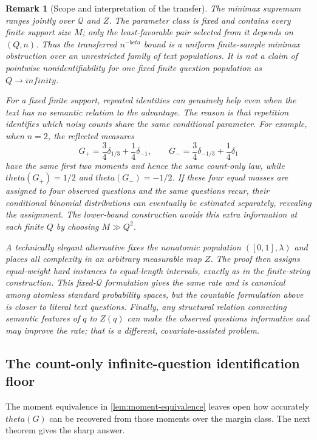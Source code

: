 \documentclass[11pt]{article}
\def\beta{beta}%
\def\theta{theta}%
\def\infty{infinity}%
\newtheorem{remark}[theorem]{Remark}
\newcommand{\calQ}{\mathcal Q}
\newcommand\ced[1]{{\color{teal!70!black} #1}}
\begin{document}
\begin{remark}[Scope and interpretation of the transfer]
\label{rem:transfer-scope}
The minimax supremum ranges jointly over $\calQ$ and $Z$.  The parameter class is fixed and contains every finite support size $M$; only the least-favorable pair selected from it depends on $(Q,n)$.  Thus the transferred $n^{-\beta}$ bound is a uniform finite-sample minimax obstruction over an unrestricted family of text populations.  It is not a claim of pointwise nonidentifiability for one fixed finite question population as $Q\to\infty$.

For a fixed finite support, repeated identities can genuinely help even when the text has no semantic relation to the advantage.  The reason is that repetition identifies which noisy counts share the same conditional parameter.  For example, when $n=2$, the reflected measures
\[
G_+=\frac34\delta_{1/3}+\frac14\delta_{-1},
\qquad
G_-=\frac34\delta_{-1/3}+\frac14\delta_{1}
\]
have the same first two moments and hence the same count-only law, while $\theta(G_+)=1/2$ and $\theta(G_-)=-1/2$.  If these four equal masses are assigned to four observed questions and the same questions recur, their conditional binomial distributions can eventually be estimated separately, revealing the assignment.  The lower-bound construction avoids this extra information at each finite $Q$ by choosing $M\gg Q^2$.

A technically elegant alternative fixes the nonatomic population $([0,1],\lambda)$ and places all complexity in an arbitrary measurable map $Z$.  The proof then assigns equal-weight hard instances to equal-length intervals, exactly as in the finite-string construction.  This fixed-$\calQ$ formulation gives the same rate and is canonical among atomless standard probability spaces, but the countable formulation above is closer to literal text questions.  Finally, any structural relation connecting semantic features of $q$ to $Z(q)$ can make the observed questions informative and may improve the rate; that is a different, covariate-assisted problem.
\end{remark}

\subsection{The count-only infinite-question identification floor}

\ced{The moment equivalence in \cref{lem:moment-equivalence} leaves open how accurately $\theta(G)$ can be recovered from those moments over the margin class.  The next theorem gives the sharp answer.}
\end{document}
